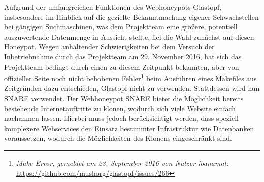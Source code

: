 Aufgrund der umfangreichen Funktionen des Webhoneypots Glastopf, insbesondere im Hinblick auf die gezielte Bekanntmachung eigener Schwachstellen bei gängigen Suchmaschinen, was dem Projektteam eine größere, potentiell auszuwertende Datenmenge in Aussicht stellte, fiel die Wahl zunächst auf diesen Honeypot. Wegen anhaltender Schwierigkeiten bei dem Versuch der Inbetriebnahme durch das Projektteam am 29. November 2016, hat sich das Projektteam bedingt durch einen zu diesem Zeitpunkt bekannten, aber von offizieller Seite noch nicht behobenen Fehler\footnote{ \textit{Make-Error, gemeldet am 23. September 2016 von Nutzer ioanamat}: \url{https://github.com/mushorg/glastopf/issues/266}} beim Ausführen eines Makefiles aus Zeitgründen dazu entschieden, Glastopf nicht zu verwenden. Stattdessen wird nun SNARE verwendet. Der Webhoneypot SNARE bietet die Möglichkeit bereits bestehende Internetauftritte zu klonen, wodurch sich viele Website einfach nachahmen lassen. Hierbei muss jedoch berücksichtigt werden, dass speziell komplexere Webservices den Einsatz bestimmter Infrastruktur wie Datenbanken voraussetzen, wodurch die Möglichkeiten des Klonens eingeschränkt sind.

